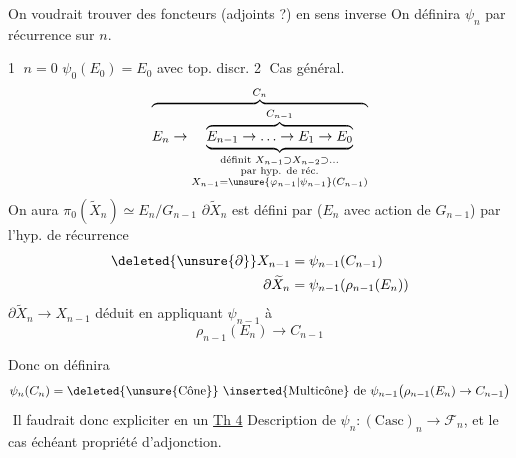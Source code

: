 On voudrait trouver des foncteurs (adjoints ?) en sens inverse
On définira $\psi_n$ par récurrence sur $n$.

\textcircled{1} $n=0$ \qquad $\psi_0(E_0)=E_0$ avec top. discr.
\textcircled{2} Cas général.
\[ \overbrace{E_n\to\underbrace{\overbrace{E_{n-1}\to\ldots\to E_1\to E_0}^{C_{n-1}}}_{\substack{\text{définit }X_{n-1}\supset X_{n-2}\supset\ldots\\\text{par hyp. de réc.}\\X_{n-1}=\unsure{\varphi_{n-1}|\psi_{n-1}}(C_{n-1})}}}^{C_n} \]
On aura \quad $\pi_0(\widetilde X_n)\simeq E_n/G_{n-1}$
$\partial\widetilde X_n$ est défini par  ($E_n$ avec action de $G_{n-1}$) par l'hyp. de récurrence
\[ \begin{aligned} \deleted{\unsure{\partial}}X_{n-1}&=\psi_{n-1}(C_{n-1})\\ \partial\widetilde X_n&=\psi_{n-1}(\rho_{n-1}(E_n)) \end{aligned} \]
$\partial\widetilde X_n\to X_{n-1}$ déduit en appliquant $\psi_{n-1}$ à
\[ \rho_{n-1}(E_n)\longrightarrow C_{n-1} \]

Donc on définira
\[ \psi_n(C_n)=\text{\deleted{\unsure{Cône}} \inserted{Multicône} de }\psi_{n-1}\bigl(\rho_{n-1}(E_n)\to C_{n-1}\bigr) \]
\textemdash\,\textemdash\,\textemdash\quad Il faudrait donc expliciter en un \uline{Th 4} Description de $\psi_n\colon(\mathrm{Casc})_n\to\mathcal F_n$, et le cas échéant propriété d'adjonction.
